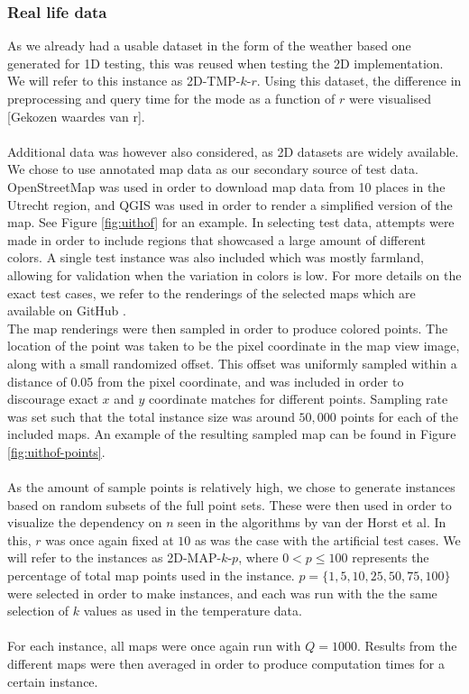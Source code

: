 \documentclass{article}
\newcommand{\todo}[1]{{\color{red}[#1]}}
\newcommand{\fb}[1]{{\color{blue}#1}}
\begin{document}
\subsubsection*{Real life data}
\fb{As we already had a usable dataset in the form of the weather based one generated for 1D testing, this was reused when testing the 2D implementation. We will refer to this instance as 2D-TMP-$k$-$r$. Using this dataset, the difference in preprocessing and query time for the mode as a function of $r$ were visualised \todo{Gekozen waardes van r}.} \\\\
Additional data was however also considered, as 2D datasets are widely available. We chose to use annotated map data as our secondary source of test data. OpenStreetMap \cite{OpenStreetMap} was used in order to download map data from 10 places in the Utrecht region, and QGIS \cite{QGIS_software} was used in order to render a simplified version of the map. See Figure \ref{fig:uithof} for an example. In selecting test data, attempts were made in order to include regions that showcased a large amount of different colors. A single test instance was also included which was mostly farmland, allowing for validation when the variation in colors is low. For more details on the exact test cases, we refer to the renderings of the selected maps which are available on GitHub \cite{vanderPlasImplementation}. \\
The map renderings were then sampled in order to produce colored points. The location of the point was taken to be the pixel coordinate in the map view image, along with a small randomized offset. This offset was uniformly sampled within a distance of 0.05 from the pixel coordinate, and was included in order to discourage exact $x$ and $y$ coordinate matches for different points. Sampling rate was set such that the total instance size was around $50,000$ points for each of the included maps. An example of the resulting sampled map can be found in Figure \ref{fig:uithof-points}. \\\\
\fb{As the amount of sample points is relatively high, we chose to generate instances based on random subsets of the full point sets. These were then used in order to visualize the dependency on $n$ seen in the algorithms by van der Horst et al. In this, $r$ was once again fixed at $10$ as was the case with the artificial test cases. We will refer to the instances as 2D-MAP-$k$-$p$, where $0 < p \leq 100$ represents the percentage of total map points used in the instance. $p=\{ 1, 5, 10, 25, 50, 75, 100 \}$ were selected in order to make instances, and each was run with the the same selection of $k$ values as used in the temperature data.} \\\\
\fb{For each instance, all maps were once again run with $Q=1000$. Results from the different maps were then averaged in order to produce computation times for a certain instance.}
\end{document}
